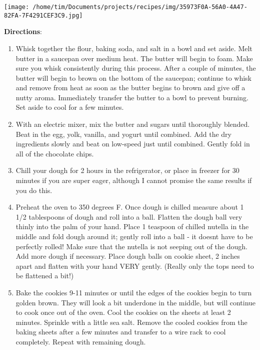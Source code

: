 \documentclass[11pt, twoside, openany]{book}
\begin{document}
\begin{minipage}[t]{0.2\linewidth}
\centering \strut\vspace*{-\baselineskip}\newline
\texttt{[image: /home/tim/Documents/projects/recipes/img/35973F0A-56A0-4A47-82FA-7F4291CEF3C9.jpg]}\\
\end{minipage}\vspace{3mm}
\textbf{Directions}:
\vspace{-3mm}\begin{enumerate}\setlength\itemsep{-1mm}
\item Whisk together the flour, baking soda, and salt in a bowl and set aside. Melt butter in a saucepan over medium heat. The butter will begin to foam. Make sure you whisk consistently during this process. After a couple of minutes, the butter will begin to brown on the bottom of the saucepan; continue to whisk and remove from heat as soon as the butter begins to brown and give off a nutty aroma. Immediately transfer the butter to a bowl to prevent burning. Set aside to cool for a few minutes.
\item With an electric mixer, mix the butter and sugars until thoroughly blended. Beat in the egg, yolk, vanilla, and yogurt until combined. Add the dry ingredients slowly and beat on low-speed just until combined. Gently fold in all of the chocolate chips.
\item Chill your dough for 2 hours in the refrigerator, or place in freezer for 30 minutes if you are super eager, although I cannot promise the same results if you do this.
\item Preheat the oven to 350 degrees F. Once dough is chilled measure about 1 1/2 tablespoons of dough and roll into a ball. Flatten the dough ball very thinly into the palm of your hand. Place 1 teaspoon of chilled nutella in the middle and fold dough around it; gently roll into a ball - it doesnt have to be perfectly rolled! Make sure that the nutella is not seeping out of the dough. Add more dough if necessary. Place dough balls on cookie sheet, 2 inches apart and flatten with your hand VERY gently. (Really only the tops need to be flattened a bit!)
\item Bake the cookies 9-11 minutes or until the edges of the cookies begin to turn golden brown. They will look a bit underdone in the middle, but will continue to cook once out of the oven. Cool the cookies on the sheets at least 2 minutes. Sprinkle with a little sea salt. Remove the cooled cookies from the baking sheets after a few minutes and transfer to a wire rack to cool completely. Repeat with remaining dough.
\end{enumerate}
\end{document}
